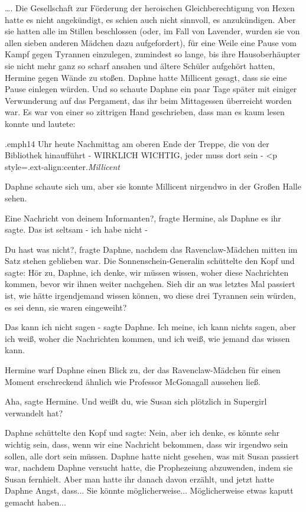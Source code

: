…. Die Gesellschaft zur Förderung der heroischen Gleichberechtigung von Hexen
hatte es nicht angekündigt, es schien auch nicht sinnvoll, es anzukündigen. Aber
sie hatten alle im Stillen beschlossen (oder, im Fall von Lavender, wurden sie
von allen sieben anderen Mädchen dazu aufgefordert), für eine Weile eine Pause
vom Kampf gegen Tyrannen einzulegen, zumindest so lange, bis ihre
Hausoberhäupter sie nicht mehr ganz so scharf ansahen und ältere Schüler
aufgehört hatten, Hermine gegen Wände zu stoßen. Daphne hatte Millicent gesagt,
dass sie eine Pause einlegen würden. Und so schaute Daphne ein paar Tage später
mit einiger Verwunderung auf das Pergament, das ihr beim Mittagessen überreicht
worden war. Es war von einer so zittrigen Hand geschrieben, dass man es kaum
lesen konnte und lautete:

\grqq{}.emph{14 Uhr heute Nachmittag am
oberen Ende der Treppe, die von der Bibliothek hinaufführt - WIRKLICH WICHTIG,
jeder muss dort sein -}   <p
style=\grqq{}.ext-align:center\grqq{}.\emph{Millicent}\grqq{}

Daphne schaute sich um, aber sie konnte Millicent nirgendwo in der Großen Halle
sehen.

\glqq{}Eine Nachricht von deinem Informanten?\grqq{}, fragte Hermine, als Daphne
es ihr sagte. \glqq{}Das ist seltsam - ich habe nicht -\grqq{}

\glqq{}Du hast was nicht?\grqq{}, fragte Daphne, nachdem das Ravenclaw-Mädchen
mitten im Satz stehen geblieben war. Die Sonnenschein-Generalin schüttelte den
Kopf und sagte: \glqq{}Hör zu, Daphne, ich denke, wir müssen wissen, woher diese
Nachrichten kommen, bevor wir ihnen weiter nachgehen. Sieh dir an was letztes
Mal passiert ist, wie hätte irgendjemand wissen können, wo diese drei Tyrannen
sein würden, es sei denn, sie waren eingeweiht?\grqq{}

\glqq{}Das kann ich nicht sagen -\grqq{} sagte Daphne. \glqq{}Ich meine, ich kann
nichts sagen, aber ich weiß, woher die Nachrichten kommen, und ich weiß, wie
jemand das wissen kann.\grqq{}

Hermine warf Daphne einen Blick zu, der das Ravenclaw-Mädchen für einen Moment
erschreckend ähnlich wie Professor McGonagall aussehen ließ.

\glqq{}Aha\grqq{}, sagte Hermine. \glqq{}Und weißt du, wie Susan sich plötzlich in
Supergirl verwandelt hat?\grqq{}

Daphne schüttelte den Kopf und sagte: \glqq{}Nein, aber ich denke, es könnte sehr
wichtig sein, dass, wenn wir eine Nachricht bekommen, dass wir irgendwo sein
sollen, alle dort sein müssen.\grqq{} Daphne hatte nicht gesehen, was mit Susan
passiert war, nachdem Daphne versucht hatte, die Prophezeiung abzuwenden, indem
sie Susan fernhielt. Aber man hatte ihr danach davon erzählt, und jetzt hatte
Daphne Angst, dass... Sie könnte möglicherweise... Möglicherweise etwas kaputt
gemacht haben...

